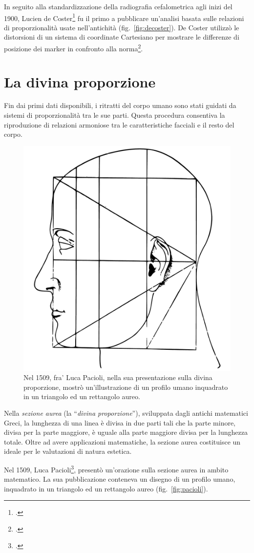 In seguito alla standardizzazione della radiografia cefalometrica agli inizi del 1900, Lucien de Coster\footcite{Coster1939} fu il primo a pubblicare un'analisi basata sulle relazioni di proporzionalità usate nell'antichità (fig.~\vref{fig:decoster}). De Coster utilizzò le distorsioni di un sistema di coordinate Cartesiano per mostrare le differenze di posizione dei marker in confronto alla norma\footcite{Izard1943}.

\section{La divina proporzione}

Fin dai primi dati disponibili, i ritratti del corpo umano sono stati guidati da sistemi di proporzionalità tra le sue parti. Questa procedura consentiva la riproduzione di relazioni armoniose tra le caratteristiche facciali e il resto del corpo.

\begin{figure}
\centering
\includegraphics[width=.45\textwidth]{./images/pacioli.pdf}
\caption{Nel 1509, fra' Luca Pacioli, nella sua presentazione sulla divina proporzione, mostrò un'illustrazione di un profilo umano inquadrato in un triangolo ed un rettangolo aureo.}
\label{fig:pacioli}
\end{figure}

Nella \textit{sezione aurea} (la ``\textit{divina proporzione}''), sviluppata dagli antichi matematici Greci, la lunghezza di una linea è divisa in due parti tali che la parte minore, divisa per la parte maggiore, è uguale alla parte maggiore divisa per la lunghezza totale. Oltre ad avere applicazioni matematiche, la sezione aurea costituisce un ideale per le valutazioni di natura estetica.

Nel 1509, Luca Pacioli\footcite{Pacioli1509}, presentò un'orazione sulla sezione aurea in ambito matematico. La sua pubblicazione conteneva un disegno di un profilo umano, inquadrato in un triangolo ed un rettangolo aureo (fig.~\vref{fig:pacioli}).

